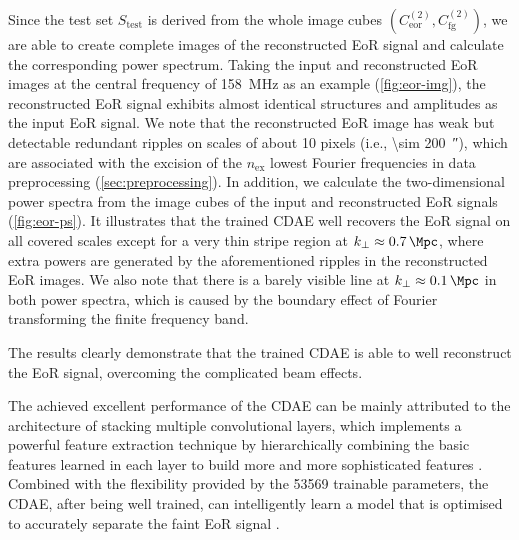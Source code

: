 \documentclass[fleqn,usenatbib]{mnras}
\newcommand{\R}[1]{\mathrm{#1}}
\newcommand{\editone}[1]{{\leavevmode\color{cyan}#1}}
\begin{document}
\editone{%
Since the test set $S_{\R{test}}$ is derived from the whole image cubes
$\left( C_{\R{eor}}^{(2)}, C_{\R{fg}}^{(2)} \right)$, we are able to create
complete images of the reconstructed EoR signal and calculate the
corresponding power spectrum.
Taking the input and reconstructed EoR images at the central frequency of
\SI{158}{\MHz} as an example (\autoref{fig:eor-img}), the reconstructed EoR
signal exhibits almost identical structures and amplitudes as the input EoR
signal.
We note that the reconstructed EoR image has weak but detectable redundant
ripples on scales of about 10 pixels (i.e., \SI{\sim 200}{\arcsecond}),
which are associated with the excision of the $n_{\R{ex}}$ lowest Fourier
frequencies in data preprocessing (\autoref{sec:preprocessing}).
In addition, we calculate the two-dimensional power spectra from the image
cubes of the input and reconstructed EoR signals (\autoref{fig:eor-ps}).
It illustrates that the trained CDAE well recovers the EoR signal on all
covered scales except for a very thin stripe region at
$k_{\bot} \approx \SI{0.7}{\per\Mpc}$, where extra powers are generated
by the aforementioned ripples in the reconstructed EoR images.
We also note that there is a barely visible line at
$k_{\bot} \approx \SI{0.1}{\per\Mpc}$ in both power spectra, which is
caused by the boundary effect of Fourier transforming the finite frequency
band.

The results clearly demonstrate that the trained CDAE is able to well
reconstruct the EoR signal, overcoming the complicated beam effects.} %
The achieved excellent performance of the CDAE can be mainly attributed
to the architecture of stacking multiple convolutional layers, which
implements a powerful feature extraction technique by hierarchically
combining the basic features learned in each layer to build more and
more sophisticated features \citep{lecun2015}.
Combined with the flexibility provided by the \num{53569} trainable
parameters, the CDAE, after being well trained, can intelligently learn a
model that is optimised to accurately separate the faint EoR signal
\citep[e.g.,][]{domingos2012}.
\end{document}
